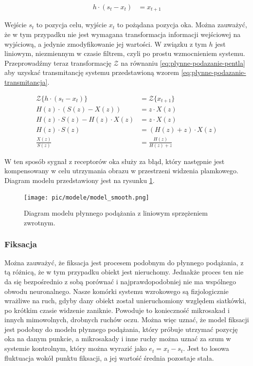 \documentclass[a4paper,twoside,12pt]{book}
\begin{document}
\begin{align}
	h \cdot (s_t - x_t) &= x_{t+1} 
	\label{eq:plynne-podazanie-pentla}
\end{align}

Wejście $s_t$ to pozycja celu, wyjście $x_t$ to pożądana pozycja oka. Można zauważyć, że w tym przypadku nie jest wymagana transformacja informacji wejściowej na wyjściową, a jedynie zmodyfikowanie jej wartości. W związku z tym $h$ jest liniowym, niezmiennym w czasie filtrem, czyli po prostu wzmocnieniem systemu. Przeprowadźmy teraz transformację $\mathcal{Z}$ na równaniu \ref{eq:plynne-podazanie-pentla} aby uzyskać transmitancję systemu przedstawioną wzorem \ref{eq:plynne-podazanie-transmitancja}.

\begin{align} %
	\mathcal{Z}\{h \cdot (s_t - x_t)\} &= \mathcal{Z}\{x_{t+1}\} \nonumber \\
	H(z) \cdot (S(z) - X(z)) &=  z \cdot X(z) \nonumber \\ %
	H(z) \cdot S(z) - H(z) \cdot X(z) &= z \cdot X(z) \nonumber \\
	H(z) \cdot S(z) &= (H(z) + z) \cdot X(z) \nonumber \\
	\frac{X(z)}{S(z)} &= \frac{H(z)}{H(z) + z} \label{eq:plynne-podazanie-transmitancja}
\end{align}   %

W ten sposób sygnał z receptorów oka służy za błąd, który następnie jest kompensowany w celu utrzymania obrazu w przestrzeni widzenia plamkowego. Diagram modelu przedstawiony jest na rysunku \ref{fig:model-smooth}.

\begin{figure}[htbp]
	\centering
	\texttt{[image: pic/modele/model\_smooth.png]}
	\caption{Diagram modelu płynnego podążania z liniowym sprzężeniem zwrotnym.}
	\label{fig:model-smooth}
\end{figure}

\subsubsection{Fiksacja}
\label{subsubsec:fiksacja}

Można zauważyć, że fiksacja jest procesem podobnym do płynnego podążania, z tą różnicą, że w tym przypadku obiekt jest nieruchomy. Jednakże proces ten nie da się bezpośrednio z sobą porównać i najprawdopodobniej nie ma wspólnego obwodu neuronalnego. Nasze komórki systemu wzrokowego są fizjologicznie wrażliwe na ruch, gdyby dany obiekt został unieruchomiony względem siatkówki, po krótkim czasie widzenie zaniknie. Powoduje to konieczność mikrosakad i innych mimowolnych, drobnych ruchów oczu. Można więc uznać, że model fiksacji jest podobny do modelu płynnego podążania, który próbuje utrzymać pozycję oka na danym punkcie, a mikrosakady i inne ruchy można uznać za szum w systemie kontrolnym, który można wyrazić jako $e_t = x_t - s_t$. Jest to losowa fluktuacja wokół punktu fiksacji, a jej wartość średnia pozostaje stała.
\end{document}
